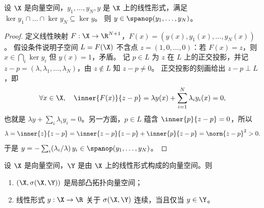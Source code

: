 \begin{lemma}
\label{res:75}
设 $\X$ 是向量空间，$y_1,\dots,y_N,y$ 是 $\X$ 上的线性形式，满足 $\ker y_1\cap\dots\cap\ker y_N\subseteq\ker y$。
则 $y\in\spanop(y_1,\dots,y_N)$。
\end{lemma}

\begin{proof}
定义线性映射 $F:\X\to\R^{N+1}$，$F(x)=(y(x),y_1(x),\dots,y_N(x))$。
假设条件说明子空间 $L=F(\X)$ 不含点 $z=(1,0,\dots,0)$：若 $F(x)=z$，则 $x\in\bigcap_i\ker y_i$ 但 $y(x)=1$，矛盾。
记 $p\in L$ 为 $z$ 在 $L$ 上的正交投影，并记 $z-p=(\lambda,\lambda_1,\dots,\lambda_N)$，由 $z\notin L$ 知 $z-p\neq0$。
正交投影的刻画给出 $z-p\perp L$，即
\[
  \forall x\in\X,\quad \inner{F(x)}{z-p}=\lambda y(x)+\sum_{i=1}^N\lambda_iy_i(x)=0,
\]
也就是 $\lambda y+\sum_i\lambda_iy_i=0$。另一方面，$p\in L$ 蕴含 $\inner{p}{z-p}=0$，所以
\[
  \lambda=\inner{z}{z-p}=\inner{z-p}{z-p}+\inner{p}{z-p}=\norm{z-p}^2>0 .
\]
于是 $y=-\sum_i(\lambda_i/\lambda)\,y_i\in\spanop(y_1,\dots,y_N)$。
\end{proof}

\begin{proposition}
\label{res:73}
设 $\X$ 是向量空间，$\Y$ 是由 $\X$ 上的线性形式构成的向量空间。则
\begin{enumerate}[label=(\roman*)]
  \item $(\X,\sigma(\X,\Y))$ 是局部凸拓扑向量空间；
  \item 线性形式 $y:\X\to\R$ 关于 $\sigma(\X,\Y)$ 连续，当且仅当 $y\in\Y$。
\end{enumerate}
\end{proposition}

